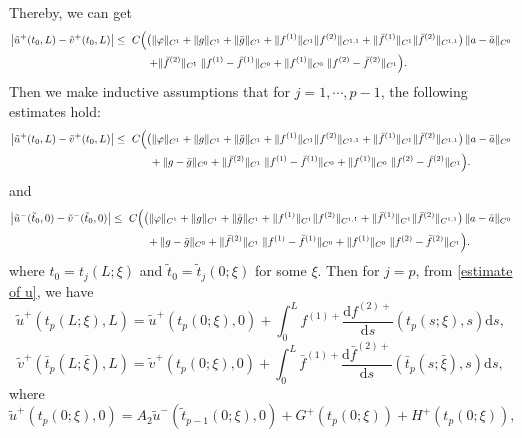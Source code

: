 \documentclass[a4paper,reqno,11pt]{amsart}
\numberwithin{equation}{section} %
\begin{document}
Thereby, we can get
$$
\begin{aligned}
\bigl|\tilde u^+(t_0,L)-\tilde{v}^{+}(t_0,L)\bigr|
\le{}&\ C\Bigl(
  \bigl(\|\varphi\|_{C^{1}}+\|g\|_{C^{1}}+\|\bar g\|_{C^{1}}
   + \|f^{(1)}\|_{C^{1}}\|f^{(2)}\|_{C^{1,1}}
   + \|\bar f^{(1)}\|_{C^{1}}\|\bar f^{(2)}\|_{C^{1,1}}\bigr)\,
   \|a-\bar a\|_{C^{0}} \Bigr.\\
&\qquad \Bigl.+ \|\bar f^{(2)}\|_{C^{1}}\;\|f^{(1)}-\bar f^{(1)}\|_{C^{0}}
        + \|f^{(1)}\|_{C^{0}}\;\|f^{(2)}-\bar f^{(2)}\|_{C^{1}}
\Bigr).
\end{aligned}
$$
Then we make inductive assumptions that for $j=1,\cdots,p-1$, the following estimates hold:
$$
\begin{aligned}
\bigl|\tilde u^+(t_0,L)-\tilde{v}^{+}(t_0,L)\bigr|
\le{}&\ C\Bigl(
  \bigl(\|\varphi\|_{C^{1}}+\|g\|_{C^{1}}+\|\bar g\|_{C^{1}}
  + \|f^{(1)}\|_{C^{1}}\|f^{(2)}\|_{C^{1,1}}
  + \|\bar f^{(1)}\|_{C^{1}}\|\bar f^{(2)}\|_{C^{1,1}}\bigr)\,
  \|a-\bar a\|_{C^{0}} \Bigr.\\
&\qquad + \Bigl. \|g-\bar g\|_{C^{0}}
  + \|\bar f^{(2)}\|_{C^{1}}\;\|f^{(1)}-\bar f^{(1)}\|_{C^{0}}
  + \|f^{(1)}\|_{C^{0}}\;\|f^{(2)}-\bar f^{(2)}\|_{C^{1}}
\Bigr).
\end{aligned}
$$
and
$$
\begin{aligned}
\bigl|\tilde u^-(\tilde{t} _0,0)-\tilde{v}^{-}(\tilde{t} _0,0)\bigr|
\le{}&\ C\Bigl(
  \bigl(\|\varphi\|_{C^{1}}+\|g\|_{C^{1}}+\|\bar g\|_{C^{1}}
  + \|f^{(1)}\|_{C^{1}}\|f^{(2)}\|_{C^{1,1}}
  + \|\bar f^{(1)}\|_{C^{1}}\|\bar f^{(2)}\|_{C^{1,1}}\bigr)\,
  \|a-\bar a\|_{C^{0}} \Bigr.\\
&\qquad + \Bigl. \|g-\bar g\|_{C^{0}}
  + \|\bar f^{(2)}\|_{C^{1}}\;\|f^{(1)}-\bar f^{(1)}\|_{C^{0}}
  + \|f^{(1)}\|_{C^{0}}\;\|f^{(2)}-\bar f^{(2)}\|_{C^{1}}
\Bigr).
\end{aligned}
$$
where $t_0=t_j(L;\xi)$ and $\tilde{t} _0=\tilde{t} _j(0;\xi)$ for some $\xi$. Then for $j=p$, from \eqref{estimate of u}, we have
$$
\tilde{u}^{+}\left( t_p\left( L;\xi \right) ,L \right) =\tilde{u}^{+}\left( t_p\left( 0;\xi \right) ,0 \right) +\int_{0}^L{f^{(1)+}\frac{\mathrm{d}f^{(2)+}}{\mathrm{d}s}\left( t_p\left( s;\xi \right) ,s \right) \mathrm{d}s},
$$
$$
\tilde{v}^{+}\left( \bar{t}_p\left( L;\bar{\xi} \right) ,L \right) =\tilde{v}^{+}\left( t_p\left( 0;\xi \right) ,0 \right) +\int_{0 }^L{\bar{f}^{(1)+}\frac{\mathrm{d}\bar{f}^{(2)+}}{\mathrm{d}s}\left( \bar{t}_p\left( s;\bar{\xi} \right) ,s \right) \mathrm{d}s},
$$
where
$$
\tilde{u}^{+}\left( t_p\left( 0;\xi \right) ,0 \right) =A_2\tilde{u}^{-}\left(\tilde{ t} _{p-1}\left( 0;\xi \right) ,0 \right) +G^+ \left( t_p(0;\xi ) \right) +H^+\left( t_p(0;\xi ) \right) ,
$$
\end{document}
